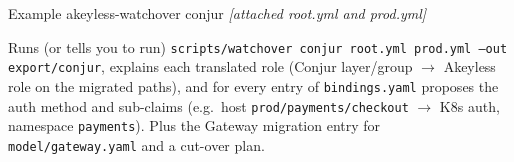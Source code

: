 \begin{session}{Example}
\you akeyless-watchover conjur \emph{[attached root.yml and prod.yml]}

\agent Runs (or tells you to run) \texttt{scripts/watchover conjur root.yml prod.yml --out export/conjur},
explains each translated role (Conjur layer/group $\rightarrow$ Akeyless role on the migrated
paths), and for every entry of \texttt{bindings.yaml} proposes the auth method and sub-claims
(e.g.\ host \texttt{prod/payments/checkout} $\rightarrow$ K8s auth, namespace \texttt{payments}).
Plus the Gateway migration entry for \texttt{model/gateway.yaml} and a cut-over plan.
\end{session}

